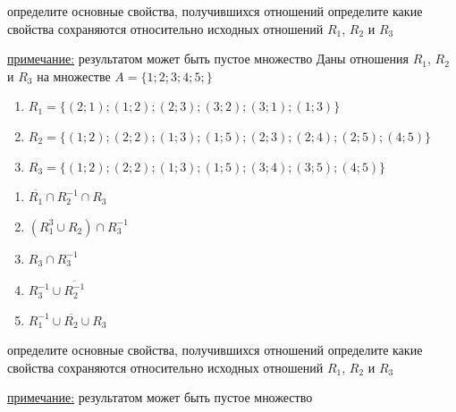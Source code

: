 \documentclass[10pt]{exam}
\begin{document}
\begin{questions}
определите основные свойства, получившихся отношений
определите какие свойства сохраняются относительно исходных отношений $R_1$, $R_2$ и $R_3$ 

\underline{примечание:} результатом может быть пустое множество\question
Даны отношения $R_1$, $R_2$ и $R_3$ на множестве $A = \{1; 2; 3; 4; 5;\}$ 
\begin{enumerate}
	\renewcommand{\labelenumi}{\alph{enumi})}
	\item $R_1 = \{(2; 1); (1; 2); (2; 3); (3; 2); (3; 1); (1; 3)\}$
	\item $R_2 = \{(1; 2); (2; 2); (1; 3); (1; 5); (2; 3); (2; 4); (2; 5); (4; 5)\}$
	\item $R_3 = \{(1; 2); (2; 2); (1; 3); (1; 5); (3; 4); (3; 5); (4; 5)\}$
\end{enumerate}

\begin{enumerate}
	\renewcommand{\labelenumi}{\alph{enumi})}
	\item $\overline{R_1} \cap R_2^{-1} \cap R_3$
	\item $(R_1^3 \cup R_2) \cap R_3^{-1}$
	\item $R_3 \cap R_3^{-1}$
	\item $R_3^{-1} \cup \overline{R_2^{-1}}$
	\item $R_1^{-1} \cup \overline{R_2} \cup R_3$
\end{enumerate}

определите основные свойства, получившихся отношений
определите какие свойства сохраняются относительно исходных отношений $R_1$, $R_2$ и $R_3$ 

\underline{примечание:} результатом может быть пустое множество

\end{questions}
\newpage
\end{document}
